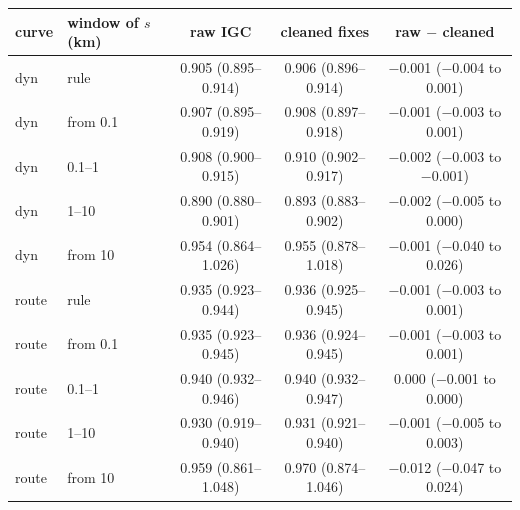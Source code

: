 \begin{tabular}{llccc}
\toprule
curve & window of $s$ (km) & raw IGC & cleaned fixes & raw $-$ cleaned \\
\midrule
dyn & rule & 0.905 (0.895--0.914) & 0.906 (0.896--0.914) & $-$0.001 ($-$0.004 to 0.001) \\
dyn & from 0.1 & 0.907 (0.895--0.919) & 0.908 (0.897--0.918) & $-$0.001 ($-$0.003 to 0.001) \\
dyn & 0.1--1 & 0.908 (0.900--0.915) & 0.910 (0.902--0.917) & $-$0.002 ($-$0.003 to $-$0.001) \\
dyn & 1--10 & 0.890 (0.880--0.901) & 0.893 (0.883--0.902) & $-$0.002 ($-$0.005 to 0.000) \\
dyn & from 10 & 0.954 (0.864--1.026) & 0.955 (0.878--1.018) & $-$0.001 ($-$0.040 to 0.026) \\
route & rule & 0.935 (0.923--0.944) & 0.936 (0.925--0.945) & $-$0.001 ($-$0.003 to 0.001) \\
route & from 0.1 & 0.935 (0.923--0.945) & 0.936 (0.924--0.945) & $-$0.001 ($-$0.003 to 0.001) \\
route & 0.1--1 & 0.940 (0.932--0.946) & 0.940 (0.932--0.947) & 0.000 ($-$0.001 to 0.000) \\
route & 1--10 & 0.930 (0.919--0.940) & 0.931 (0.921--0.940) & $-$0.001 ($-$0.005 to 0.003) \\
route & from 10 & 0.959 (0.861--1.048) & 0.970 (0.874--1.046) & $-$0.012 ($-$0.047 to 0.024) \\
\bottomrule
\end{tabular}

